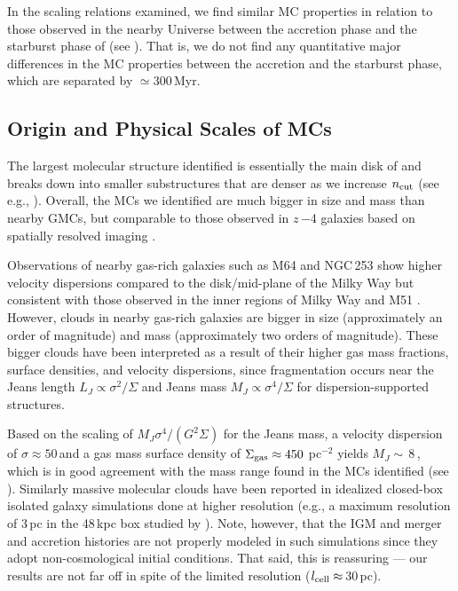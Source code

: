 \IfFileExists{emulateapjlegacy.cls}{\documentclass[iop]{emulateapjlegacy}}{\documentclass[iop]{emulateapj}}
\begin{document}
In the scaling relations examined, we find similar MC properties in relation to those observed in the nearby Universe between the accretion phase and the starburst phase of \flower (see ). That is, we do not find any quantitative major differences in the MC properties between the accretion and the starburst phase, which are separated by $\simeq$300\,Myr.

\subsection{Origin and Physical Scales of MCs} \label{sec:origin}

The largest molecular structure identified is essentially the main disk of \flower and breaks down into smaller substructures that are denser as we increase $n_{\rm cut}$ (see e.g., ). Overall, the MCs we identified are much bigger in size and mass than nearby GMCs, but comparable to those observed in $z$\,$-$4 galaxies based on spatially resolved imaging \citep{Swinbank11a}.

Observations of nearby gas-rich galaxies such as M64 and NGC\,253 show higher velocity dispersions compared to the disk/mid-plane of the Milky Way but consistent with those observed in the inner regions of Milky Way and M51 \citep{Oka01a, Rosolowsky05a, Heyer09a, Hughes13b, Leroy15a, Rice16a}.  %
However, clouds in nearby gas-rich galaxies are bigger in size (approximately an order of magnitude) and mass (approximately two orders of magnitude).
These bigger clouds have been interpreted as a result of their higher gas mass fractions, surface densities, and velocity dispersions,
since fragmentation occurs near the Jeans length $L_J\propto\sigma^2/\Sigma$ and
Jeans mass $M_J\propto\sigma^4/\Sigma$ for dispersion-supported structures.

Based on the scaling of $M_J$\eq$\sigma^4/(G^2\Sigma)$ for the Jeans mass, a
velocity dispersion of $\sigma\approx50$\,\kms and a
gas mass surface density of $\Sigma_{\rm gas}\approx450$\,\Msun\,pc$^{-2}$ yields
$M_J\sim$\,8\,\Msun, which is in good agreement with the mass range found in the MCs identified (see ).
%
Similarly massive molecular clouds have been reported in idealized closed-box isolated galaxy simulations done at higher resolution (e.g., a maximum
resolution of 3\,pc in the 48\,kpc box studied by \citealt{Behrendt16a}).
Note, however, that the IGM and merger and accretion histories are not properly modeled in such simulations since they adopt non-cosmological initial conditions. That said, this is reassuring --- our results are not far off in spite of the limited resolution ($l_{\rm cell}\approx$\,30\,pc).
\end{document}

